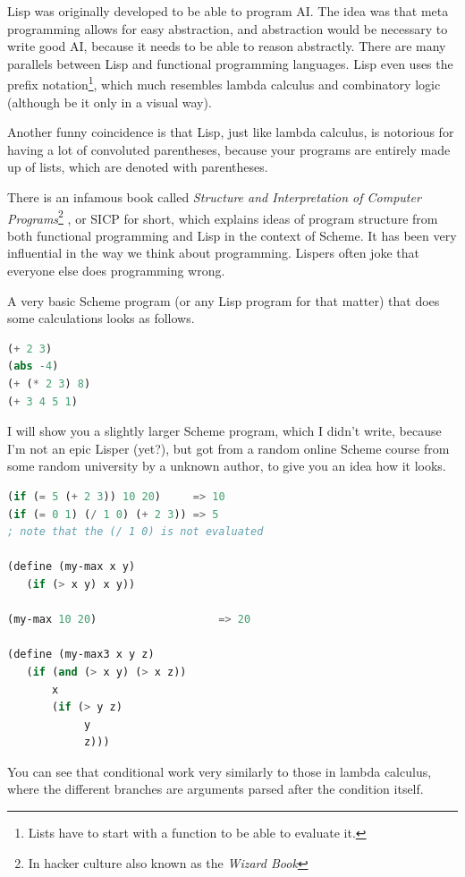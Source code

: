 \documentclass[11pt]{article}
\begin{document}
Lisp was originally developed to be able to program AI. The idea was that meta
programming allows for easy abstraction, and abstraction would be necessary to
write good AI, because it needs to be able to reason abstractly. There are many
parallels between Lisp and functional programming languages. Lisp even uses the
prefix notation\footnote{Lists have to start with a function to be able to
evaluate it.}, which much resembles lambda calculus and combinatory logic
(although be it only in a visual way).

Another funny coincidence is that Lisp, just like lambda calculus, is notorious
for having a lot of convoluted parentheses, because your programs are entirely
made up of lists, which are denoted with parentheses.

There is an infamous book called \emph{Structure and Interpretation of Computer
Programs}\footnote{In hacker culture also known as the \emph{Wizard Book}}
\parencite{sicp}, or SICP for short, which explains ideas of program structure
from both functional programming and Lisp in the context of Scheme. It has been
very influential in the way we think about programming. Lispers often joke that
everyone else does programming wrong.

A very basic Scheme program (or any Lisp program for that matter) that does
some calculations looks as follows.

\begin{lstlisting}[language=Lisp]
(+ 2 3)
(abs -4)
(+ (* 2 3) 8)
(+ 3 4 5 1)
\end{lstlisting}

I will show you a slightly larger Scheme program, which I didn't write, because
I'm not an epic Lisper (yet?), but got from a random online Scheme course from
some random university by a unknown author, to give you an idea how it looks.

\begin{lstlisting}[language=Lisp]
(if (= 5 (+ 2 3)) 10 20)     => 10 
(if (= 0 1) (/ 1 0) (+ 2 3)) => 5  
; note that the (/ 1 0) is not evaluated

(define (my-max x y)     
   (if (> x y) x y))    

(my-max 10 20)                   => 20 

(define (my-max3 x y z)
   (if (and (> x y) (> x z))
       x
       (if (> y z) 
            y
            z)))
\end{lstlisting}

You can see that conditional work very similarly to those in lambda calculus,
where the different branches are arguments parsed after the condition itself.
\end{document}
